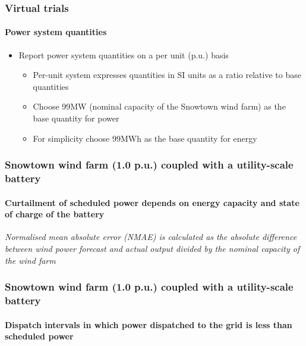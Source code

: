 \documentclass[presentation, smaller, table, svgnames]{beamer}
\begin{document}
\begin{frame}
	\frametitle{Virtual trials}
	\framesubtitle{Power system quantities}

	\begin{itemize}
		\item  Report power system quantities on a per unit (p.u.) basis
		\begin{itemize}
			\item  Per-unit system expresses quantities in SI units as a ratio relative to base quantities
			\item  Choose 99MW (nominal capacity of the Snowtown wind farm) as the base quantity for power   
			\item  For simplicity choose 99MWh as the base quantity for energy
		\end{itemize}
				
	\end{itemize}
	
\end{frame}


\begin{frame}
	\frametitle{\large Snowtown wind farm (1.0 p.u.) coupled with a utility-scale battery}
	\framesubtitle{Curtailment of scheduled power depends on energy capacity and state of charge of the battery}

	\begin{figure}[!h]
		\centering
    		\label{fig:disp_wind_bess}
		\scalebox{0.67}{
			
		}
	\end{figure}
	
	{\scriptsize \textit{Normalised mean absolute error (NMAE) is calculated as the absolute difference between wind power forecast and actual output divided by the nominal capacity of the wind farm}
	\par
	}

\end{frame}

\begin{frame}
	\frametitle{\large Snowtown wind farm (1.0 p.u.) coupled with a utility-scale battery}
	\framesubtitle{Dispatch intervals in which power dispatched to the grid is less than scheduled power}

	\begin{figure}[!h]
		\centering
    		\label{fig:disp_wind_bess}
		\scalebox{0.75}{
			
		}
	\end{figure}

\end{frame}
\end{document}
